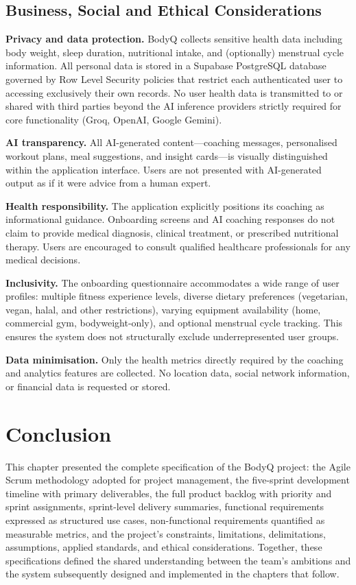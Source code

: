 \subsection{Business, Social and Ethical Considerations}

\textbf{Privacy and data protection.} BodyQ collects sensitive health data
including body weight, sleep duration, nutritional intake, and (optionally)
menstrual cycle information. All personal data is stored in a Supabase
PostgreSQL database governed by Row Level Security policies that restrict
each authenticated user to accessing exclusively their own records. No user
health data is transmitted to or shared with third parties beyond the AI
inference providers strictly required for core functionality (Groq, OpenAI,
Google Gemini).

\textbf{AI transparency.} All AI-generated content---coaching messages,
personalised workout plans, meal suggestions, and insight cards---is
visually distinguished within the application interface. Users are not
presented with AI-generated output as if it were advice from a human
expert.

\textbf{Health responsibility.} The application explicitly positions its
coaching as informational guidance. Onboarding screens and AI coaching
responses do not claim to provide medical diagnosis, clinical treatment,
or prescribed nutritional therapy. Users are encouraged to consult
qualified healthcare professionals for any medical decisions.

\textbf{Inclusivity.} The onboarding questionnaire accommodates a wide
range of user profiles: multiple fitness experience levels, diverse dietary
preferences (vegetarian, vegan, halal, and other restrictions), varying
equipment availability (home, commercial gym, bodyweight-only), and
optional menstrual cycle tracking. This ensures the system does not
structurally exclude underrepresented user groups.

\textbf{Data minimisation.} Only the health metrics directly required by
the coaching and analytics features are collected. No location data, social
network information, or financial data is requested or stored.


\section{Conclusion}

This chapter presented the complete specification of the BodyQ project:
the Agile Scrum methodology adopted for project management, the five-sprint
development timeline with primary deliverables, the full product backlog
with priority and sprint assignments, sprint-level delivery summaries,
functional requirements expressed as structured use cases, non-functional
requirements quantified as measurable metrics, and the project's
constraints, limitations, delimitations, assumptions, applied standards,
and ethical considerations. Together, these specifications defined the
shared understanding between the team's ambitions and the system
subsequently designed and implemented in the chapters that follow.

